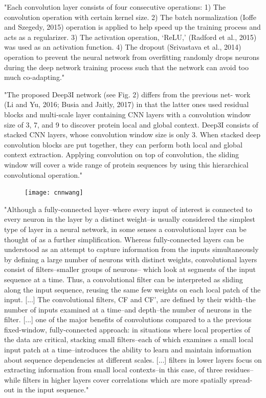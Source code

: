 	"Each convolution layer consists of four consecutive operations: 1) The convolution operation with certain kernel size. 2) The batch normalization (Ioffe and Szegedy, 2015) operation is applied to help speed up
	the training process and acts as a regularizer. 3) The activation operation, ‘ReLU,’ (Radford et al., 2015) was used as an activation function. 4) The dropout (Srivastava et al., 2014) operation to prevent the neural network from overfitting randomly drops neurons during the deep network training process such that the network can avoid too much co-adapting." \cite{Fang2017}
	
	"The proposed Deep3I network (see Fig. 2) differs from the previous net- work (Li and Yu, 2016; Busia and Jaitly, 2017) in that the latter ones used residual blocks and multi-scale layer containing CNN layers with a convolution window size of 3, 7, and 9 to discover protein local and global context. Deep3I consists of stacked CNN layers, whose convolution window size is only 3. When stacked deep convolution blocks are put together, they can perform both local and global context extraction. Applying convolution on top of convolution, the sliding window will cover a wide range of protein sequences by using this hierarchical convolutional operation." \cite{Fang2017}
	\begin{figure}[h]
		\centering
		\texttt{[image: cnnwang]}
	\end{figure}
	
	"Although a fully-connected layer–where every input of interest is connected to every neuron in the layer by a distinct weight–is usually considered the simplest type of layer in a neural network, in some senses a convolutional layer can be thought of as a further simplification. Whereas fully-connected layers can be understood as an attempt to capture information from the inputs simultaneously by defining a large number of neurons with distinct weights, convolutional layers consist of filters–smaller groups of neurons– which look at segments of the input sequence at a time. Thus, a convolutional filter can be interpreted as sliding along the input sequence, reusing the same few weights on each local patch of the input. [...] The convolutional filters, CF and CF’, are defined by their width–the number of inputs examined at a time–and depth–the number of neurons in the filter. [...] one of the major benefits of convolutions compared to a the previous fixed-window, fully-connected approach: in situations where local properties of the data are critical, stacking small filters–each of which examines a small local input patch at a time–introduces the ability to learn and maintain information about sequence dependencies at different scales. [...] filters in lower layers focus on extracting information from small local contexts–in this case, of three residues–while filters in higher layers cover correlations which are more spatially spread-out in the input sequence." \cite{Busia2017}
	
